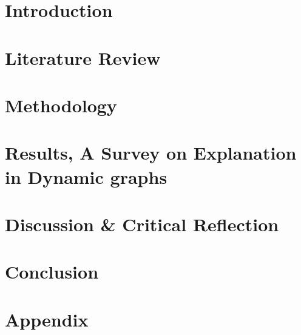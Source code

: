 \documentclass[10pt]{llncs}
\newenvironment{acknowledgement}{
    \list{}{\advance\topsep by0.35cm\relax
    \leftmargin=1cm
    \labelwidth=0cm
    \listparindent=0cm
    \itemindent\listparindent
    \rightmargin\leftmargin}\item[\hskip\labelsep
    \bfseries\ackname]
}
\renewenvironment{abstract}{
    \list{}{\advance\topsep by0.35cm\relax
    \leftmargin=1cm
    \labelwidth=0cm
    \listparindent=0cm
    \itemindent\listparindent
    \rightmargin\leftmargin}\item[\hskip\labelsep
    \bfseries\abstractname]
}
\begin{document}

\restoregeometry

\normalsize\begin{abstract} \normalsize

\end{abstract}
\clearpage
\restoregeometry

%

\tableofcontents
\clearpage

\section{Introduction} 


\section{Literature Review}


\section{Methodology}


\section{Results, A Survey on Explanation in Dynamic graphs}


\section{Discussion \& Critical Reflection}


\section{Conclusion}

\clearpage


 \label{references}

\appendix
\section*{Appendix}

\clearpage

\listoffigures

\listoftables
\end{document}
